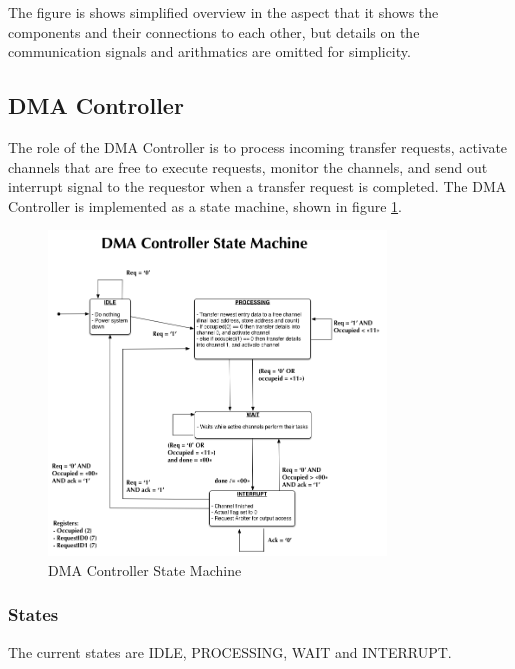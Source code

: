 The figure is shows simplified overview in the aspect that it shows the components and their connections to each other, but details on the communication signals and arithmatics are omitted for simplicity. 

\subsection{DMA Controller}
The role of the DMA Controller is to process incoming transfer requests, activate channels that are free to execute requests, monitor the channels, and send out interrupt signal to the requestor when a transfer request is completed. 
The DMA Controller is implemented as a state machine, shown in figure \ref{fig:DMAControllerStateMachine}.

\begin{figure}[h!]
    \centering
    \includegraphics[width=0.8\textwidth]{Figures/DMA/StateMachineFinal}
    \caption{DMA Controller State Machine}
    \label{fig:DMAControllerStateMachine}
\end{figure}

\subsubsection{States}
The current states are IDLE, PROCESSING, WAIT and INTERRUPT.

